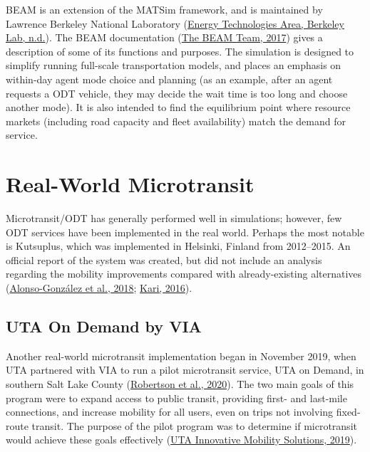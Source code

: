 \documentclass[
]{report}
\begin{document}
BEAM is an extension of the MATSim framework, and is maintained by Lawrence Berkeley National Laboratory (\protect\hyperlink{ref-BEAMlbnl}{Energy Technologies Area, Berkeley Lab, n.d.}). The BEAM documentation (\protect\hyperlink{ref-beamdocs}{The BEAM Team, 2017}) gives a description of some of its functions and purposes. The simulation is designed to simplify running full-scale transportation models, and places an emphasis on within-day agent mode choice and planning (as an example, after an agent requests a ODT vehicle, they may decide the wait time is too long and choose another mode). It is also intended to find the equilibrium point where resource markets (including road capacity and fleet availability) match the demand for service.

\hypertarget{real-world-microtransit}{%
\section{Real-World Microtransit}\label{real-world-microtransit}}

Microtransit/ODT has generally performed well in simulations; however, few ODT services have been implemented in the real world. Perhaps the most notable is Kutsuplus, which was implemented in Helsinki, Finland from 2012--2015. An official report of the system was created, but did not include an analysis regarding the mobility improvements compared with already-existing alternatives (\protect\hyperlink{ref-Alonso-Gonzalez2018}{Alonso-González et al., 2018}; \protect\hyperlink{ref-Kari2016}{Kari, 2016}).

\hypertarget{uta-on-demand-by-via}{%
\subsection{UTA On Demand by VIA}\label{uta-on-demand-by-via}}

Another real-world microtransit implementation began in November 2019, when UTA partnered with VIA to run a pilot microtransit service, UTA on Demand, in southern Salt Lake County (\protect\hyperlink{ref-UTAreport}{Robertson et al., 2020}). The two main goals of this program were to expand access to public transit, providing first- and last-mile connections, and increase mobility for all users, even on trips not involving fixed-route transit. The purpose of the pilot program was to determine if microtransit would achieve these goals effectively (\protect\hyperlink{ref-UTAevalDEC}{UTA Innovative Mobility Solutions, 2019}).
\end{document}
